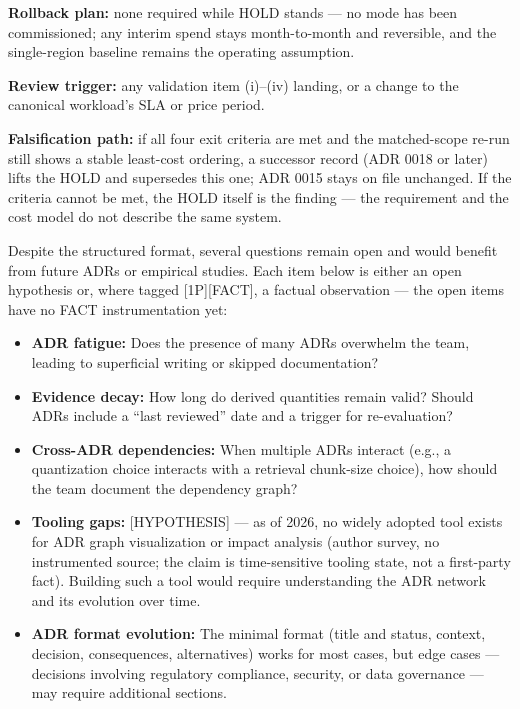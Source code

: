 \textbf{Rollback plan:} none required while HOLD stands --- no mode has
been commissioned; any interim spend stays month-to-month and
reversible, and the single-region baseline remains the operating
assumption.

\textbf{Review trigger:} any validation item (i)--(iv) landing, or a
change to the canonical workload's SLA or price period.

\textbf{Falsification path:} if all four exit criteria are met and the
matched-scope re-run still shows a stable least-cost ordering, a
successor record (ADR 0018 or later) lifts the HOLD and supersedes this
one; ADR 0015 stays on file unchanged. If the criteria cannot be met,
the HOLD itself is the finding --- the requirement and the cost model do
not describe the same system.

\label{what-we-still-dont-know}


Despite the structured format, several questions remain open and would
benefit from future ADRs or empirical studies. Each item below is either
an open hypothesis or, where tagged \mbox{{[}1P{]}}\hspace{0pt}\mbox{{[}FACT{]}}, a factual
observation --- the open items have no FACT instrumentation yet:

\begin{itemize}
\tightlist
\item
  \textbf{ADR fatigue:} Does the presence of many ADRs overwhelm the
  team, leading to superficial writing or skipped documentation?
\item
  \textbf{Evidence decay:} How long do derived quantities remain valid?
  Should ADRs include a ``last reviewed'' date and a trigger for
  re-evaluation?
\item
  \textbf{Cross-ADR dependencies:} When multiple ADRs interact (e.g., a
  quantization choice interacts with a retrieval chunk-size choice), how
  should the team document the dependency graph?
\item
  \textbf{Tooling gaps:} \mbox{{[}HYPOTHESIS{]}} --- as of 2026, no widely
  adopted tool exists for ADR graph visualization or impact analysis
  (author survey, no instrumented source; the claim is time-sensitive
  tooling state, not a first-party fact). Building such a tool would
  require understanding the ADR network and its evolution over time.
\item
  \textbf{ADR format evolution:} The minimal format (title and status,
  context, decision, consequences, alternatives) works for most cases,
  but edge cases --- decisions involving regulatory compliance,
  security, or data governance --- may require additional sections.
\end{itemize}

